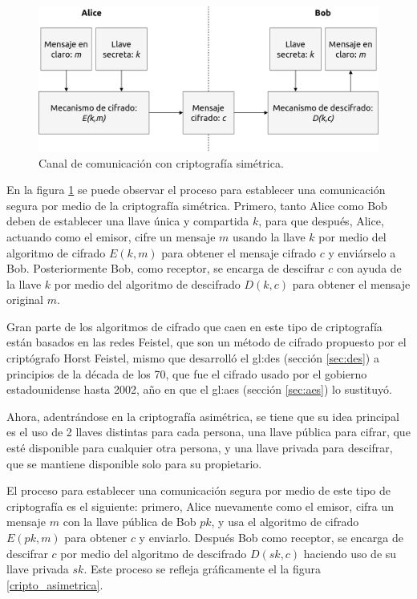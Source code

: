 \begin{figure}
  \begin{center}
    \includegraphics[width=0.8\linewidth]
      {../../../../diagramas_comunes/marco_teorico/cripto_simetrica.png}
    \caption{Canal de comunicación con criptografía simétrica.}
    \label{cripto_simetrica}
  \end{center}
\end{figure}

En la figura \ref{cripto_simetrica} se puede observar el proceso para
establecer una comunicación segura por medio de la criptografía simétrica.
Primero, tanto Alice como Bob deben de establecer una llave única y
compartida $k$, para que después, Alice, actuando como el emisor, cifre un
mensaje $m$ usando la llave $k$ por medio del algoritmo de cifrado $E(k,m)$
para obtener el mensaje cifrado $c$ y enviárselo a Bob. Posteriormente
Bob, como receptor, se encarga de descifrar $c$ con ayuda de la llave $k$
por medio del algoritmo de descifrado $D(k,c)$ para obtener el mensaje original
$m$.

Gran parte de los algoritmos de cifrado que caen en este tipo de criptografía
están basados en las redes Feistel, que son un método de cifrado propuesto
por el criptógrafo Horst Feistel, mismo que desarrolló el \gls{gl:des}
(sección \ref{sec:des}) a principios de la década de los 70, que fue el
cifrado usado por el gobierno estadounidense hasta 2002, año en que el
\gls{gl:aes} (sección \ref{sec:aes}) lo sustituyó.

Ahora, adentrándose en la criptografía asimétrica, se tiene que su idea
principal es el uso de 2 llaves distintas para cada persona, una llave
pública para cifrar, que esté disponible para cualquier otra persona, y una
llave privada para descifrar, que se mantiene disponible solo para su
propietario.

El proceso para establecer una comunicación segura por medio de este tipo
de criptografía es el siguiente: primero, Alice nuevamente como el emisor,
cifra un mensaje $m$ con la llave pública de Bob $pk$, y usa el algoritmo de
cifrado $E(pk,m)$ para obtener $c$ y enviarlo. Después Bob como receptor,
se encarga de descifrar $c$ por medio del algoritmo de descifrado
$D(sk,c)$ haciendo uso de su llave privada $sk$. Este proceso se refleja
gráficamente el la figura \ref{cripto_asimetrica}.

